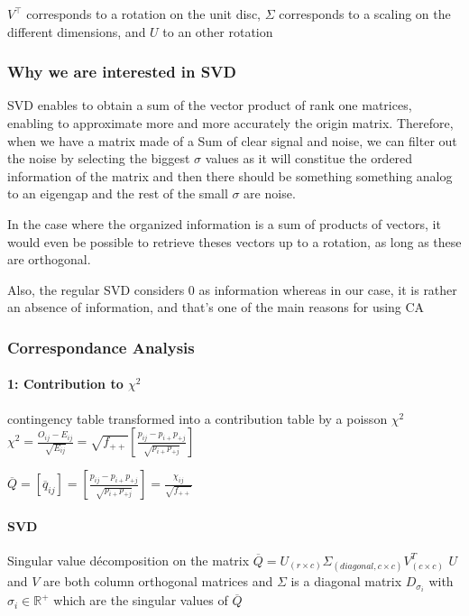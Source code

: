 \documentclass{article}
\begin{document}
$V^\intercal$ corresponds to a rotation on the unit disc, $\Sigma$ corresponds to a  scaling on the different dimensions, and $U$ to an other rotation 

\subsubsection{Why we are interested in SVD}

SVD enables to obtain a sum of the vector product of rank one matrices, enabling to approximate more and more accurately the origin matrix. Therefore, when we have a matrix made of a Sum of clear signal and noise, we can filter out the noise by selecting the biggest $\sigma$ values as it will constitue the ordered information of the matrix and then there should be something something analog to an eigengap and the rest of the small $\sigma$ are noise.

In the case where the organized information is a sum of products of vectors, it would even be possible to retrieve theses vectors up to a rotation, as long as these are orthogonal.

Also, the regular SVD considers 0 as information whereas in our case, it is rather an absence of information, and that's one of the main reasons for using CA

\subsubsection{Correspondance Analysis}

\paragraph{1: Contribution to $\chi^2$}

contingency table transformed into a contribution table by a poisson $\chi^2$ 
$\chi^2 = \frac{O_{ij} -  E_{ij}}{\sqrt{E_{ij}}} = \sqrt{f_{++}}[\frac{p_{ij} - p_{i+}p_{+j}}{\sqrt{p_{i+}p_{+j}}}]$

$\overline{Q} = [\overline{q}_{ij}] = [\frac{p_{ij} - p_{i+}p_{+j}}{\sqrt{p_{i+}p_{+j}}}] = \frac{\chi_{ij}}{\sqrt{f_{++}}}$

\paragraph{SVD}

Singular value décomposition on the matrix $\overline{Q} = U_{(r\times c)} \Sigma_{(diagonal, c\times c)} V_{(c \times c)}^T$ 
$U$ and $V$ are both column orthogonal matrices and $\Sigma$ is a diagonal matrix $D_{\sigma_i}$ with $\sigma_i \in \mathbb{R}^+$ which are the singular values of $\overline{Q}$
\end{document}
